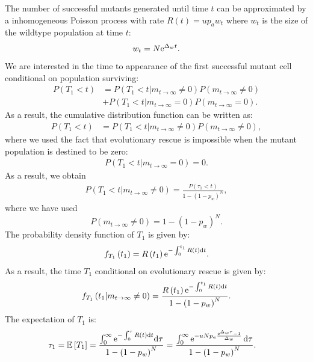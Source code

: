 \documentclass[12pt]{extarticle}
\renewcommand{\d}{{\rm d}}
\newcommand{\e}{{\rm e}}
\begin{document}
The number of successful mutants generated until time $t$ can be approximated by a inhomogeneous Poisson process with rate $R\left(t\right)=up_aw_t$
where $w_t$ is the size of the wildtype population at time $t$: 
\begin{equation}
w_t=N\e^{\Delta_wt}.
\end{equation}
We are interested in the time to appearance of the first successful mutant cell conditional on population surviving:
\begin{align*}
P\left(T_1<t\right)&=P\left(T_1<t|m_{t\rightarrow\infty}\neq0\right)P\left(m_{t\rightarrow\infty}\neq0\right)\\
&+P\left(T_1<t|m_{t\rightarrow\infty}=0\right)P\left(m_{t\rightarrow\infty}=0\right).
\end{align*}
As a result, the cumulative distribution function can be written as:
\begin{align*}
P\left(T_1<t\right)&=P\left(T_1<t|m_{t\rightarrow\infty}\neq0\right)P\left(m_{t\rightarrow\infty}\neq0\right),
\end{align*}
where we used the fact that evolutionary rescue is impossible when the mutant population is destined to be zero:
\begin{align*}
P\left(T_1<t|m_{t\rightarrow\infty}=0\right)=0.
\end{align*}
As a result, we obtain 
\begin{align}
P\left(T_1<t|m_{t\rightarrow\infty}\neq0\right)=\frac{P\left(\tau_1<t\right)}{1-\left(1-p_w\right)^N},
\end{align}
where we have used
\begin{equation}
P\left(m_{t\rightarrow\infty}\neq0\right)=1-\left(1-p_w\right)^N.
\end{equation}
The probability density function of $T_1$ is given by:
\begin{align}
f_{T_1}\left(t_1\right)=R\left(t_1\right)\e^{-\int_0^{t_1} R(t)\d t}.
\end{align}
As a result, the time $T_1$ conditional on evolutionary rescue is given by:
\begin{align}
f_{T_1}\left(t_1|m_{t\rightarrow\infty}\neq0\right)=\frac{R\left(t_1\right)\e^{-\int_0^{t_1} R(t)\d t}}{1-\left(1-p_w\right)^N}.
\end{align}
The expectation of $T_1$ is:
\begin{align}\label{meantime1}
\tau_1=\mathbb{E}\left[T_1\right]&=\frac{\int_0^\infty\e^{-\int_0^\tau R(t)\d t}\d\tau}{1-\left(1-p_w\right)^N}=\frac{\int_0^\infty\e^{-uNp_a\frac{\e^{\Delta_w\tau}-1}{\Delta_w}}\,\d\tau}{1-\left(1-p_w\right)^N}.
\end{align}
\end{document}
